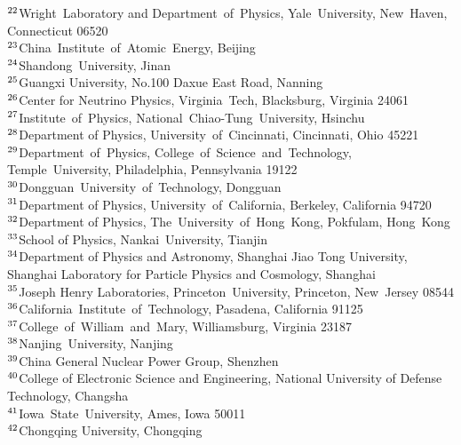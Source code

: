 {$^{22}$Wright~Laboratory and Department~of~Physics, Yale~University, New~Haven, Connecticut 06520 \\ 
$^{23}$China~Institute~of~Atomic~Energy, Beijing \\ 
$^{24}$Shandong~University, Jinan \\ 
$^{25}$Guangxi University, No.100 Daxue East Road, Nanning \\ 
$^{26}$Center for Neutrino Physics, Virginia~Tech, Blacksburg, Virginia  24061 \\ 
$^{27}$Institute~of~Physics, National~Chiao-Tung~University, Hsinchu \\ 
$^{28}$Department of Physics, University~of~Cincinnati, Cincinnati, Ohio 45221 \\ 
$^{29}$Department~of~Physics, College~of~Science~and~Technology, Temple~University, Philadelphia, Pennsylvania  19122 \\ 
$^{30}$Dongguan~University~of~Technology, Dongguan \\ 
$^{31}$Department of Physics, University~of~California, Berkeley, California  94720 \\ 
$^{32}$Department of Physics, The~University~of~Hong~Kong, Pokfulam, Hong~Kong \\ 
$^{33}$School of Physics, Nankai~University, Tianjin \\ 
$^{34}$Department of Physics and Astronomy, Shanghai Jiao Tong University, Shanghai Laboratory for Particle Physics and Cosmology, Shanghai \\ 
$^{35}$Joseph Henry Laboratories, Princeton~University, Princeton, New~Jersey 08544 \\ 
$^{36}$California~Institute~of~Technology, Pasadena, California 91125 \\ 
$^{37}$College~of~William~and~Mary, Williamsburg, Virginia  23187 \\ 
$^{38}$Nanjing~University, Nanjing \\ 
$^{39}$China General Nuclear Power Group, Shenzhen \\ 
$^{40}$College of Electronic Science and Engineering, National University of Defense Technology, Changsha \\ 
$^{41}$Iowa~State~University, Ames, Iowa  50011 \\ 
$^{42}$Chongqing University, Chongqing \\ 
} 
